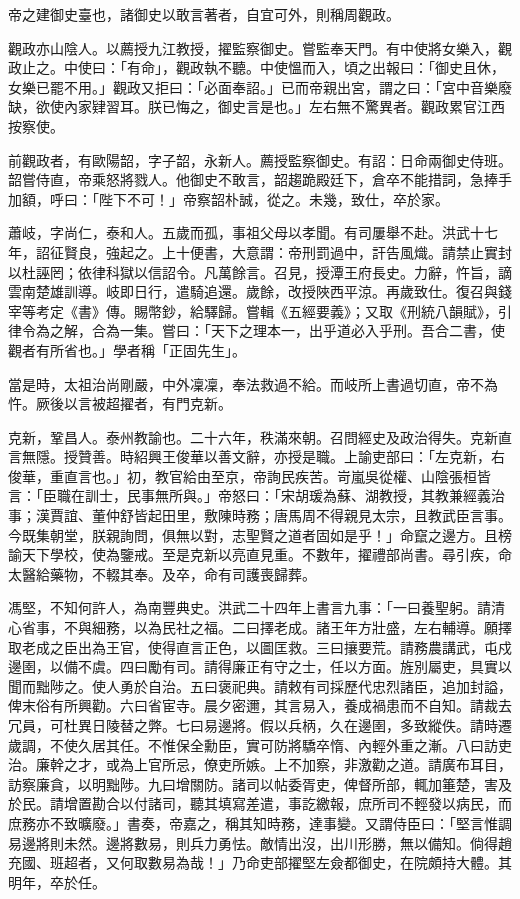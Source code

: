 \begin{pinyinscope}
帝之建御史臺也，諸御史以敢言著者，自宜可外，則稱周觀政。

觀政亦山陰人。以薦授九江教授，擢監察御史。嘗監奉天門。有中使將女樂入，觀政止之。中使曰：「有命」，觀政執不聽。中使慍而入，頃之出報曰：「御史且休，女樂已罷不用。」觀政又拒曰：「必面奉詔。」已而帝親出宮，謂之曰：「宮中音樂廢缺，欲使內家肄習耳。朕已悔之，御史言是也。」左右無不驚異者。觀政累官江西按察使。

前觀政者，有歐陽韶，字子韶，永新人。薦授監察御史。有詔：日命兩御史侍班。韶嘗侍直，帝乘怒將戮人。他御史不敢言，韶趨跪殿廷下，倉卒不能措詞，急捧手加額，呼曰：「陛下不可！」帝察韶朴誠，從之。未幾，致仕，卒於家。

蕭岐，字尚仁，泰和人。五歲而孤，事祖父母以孝聞。有司屢舉不赴。洪武十七年，詔征賢良，強起之。上十便書，大意謂：帝刑罰過中，訐告風熾。請禁止實封以杜誣罔；依律科獄以信詔令。凡萬餘言。召見，授潭王府長史。力辭，忤旨，謫雲南楚雄訓導。岐即日行，遣騎追還。歲餘，改授陜西平涼。再歲致仕。復召與錢宰等考定《書》傳。賜幣鈔，給驛歸。嘗輯《五經要義》；又取《刑統八韻賦》，引律令為之解，合為一集。嘗曰：「天下之理本一，出乎道必入乎刑。吾合二書，使觀者有所省也。」學者稱「正固先生」。

當是時，太祖治尚剛嚴，中外凜凜，奉法救過不給。而岐所上書過切直，帝不為忤。厥後以言被超擢者，有門克新。

克新，鞏昌人。泰州教諭也。二十六年，秩滿來朝。召問經史及政治得失。克新直言無隱。授贊善。時紹興王俊華以善文辭，亦授是職。上諭吏部曰：「左克新，右俊華，重直言也。」初，教官給由至京，帝詢民疾苦。岢嵐吳從權、山陰張桓皆言：「臣職在訓士，民事無所與。」帝怒曰：「宋胡瑗為蘇、湖教授，其教兼經義治事；漢賈誼、董仲舒皆起田里，敷陳時務；唐馬周不得親見太宗，且教武臣言事。今既集朝堂，朕親詢問，俱無以對，志聖賢之道者固如是乎！」命竄之邊方。且榜諭天下學校，使為鑒戒。至是克新以亮直見重。不數年，擢禮部尚書。尋引疾，命太醫給藥物，不輟其奉。及卒，命有司護喪歸葬。

馮堅，不知何許人，為南豐典史。洪武二十四年上書言九事：「一曰養聖躬。請清心省事，不與細務，以為民社之福。二曰擇老成。諸王年方壯盛，左右輔導。願擇取老成之臣出為王官，使得直言正色，以圖匡救。三曰攘要荒。請務農講武，屯戍邊圉，以備不虞。四曰勵有司。請得廉正有守之士，任以方面。旌別屬吏，具實以聞而黜陟之。使人勇於自治。五曰褒祀典。請敕有司採歷代忠烈諸臣，追加封謚，俾末俗有所興勸。六曰省宦寺。晨夕密邇，其言易入，養成禍患而不自知。請裁去冗員，可杜異日陵替之弊。七曰易邊將。假以兵柄，久在邊圉，多致縱佚。請時遷歲調，不使久居其任。不惟保全勳臣，實可防將驕卒惰、內輕外重之漸。八曰訪吏治。廉幹之才，或為上官所忌，僚吏所嫉。上不加察，非激勸之道。請廣布耳目，訪察廉貪，以明黜陟。九曰增關防。諸司以帖委胥吏，俾督所部，輒加箠楚，害及於民。請增置勘合以付諸司，聽其填寫差遣，事訖繳報，庶所司不輕發以病民，而庶務亦不致曠廢。」書奏，帝嘉之，稱其知時務，達事變。又謂侍臣曰：「堅言惟調易邊將則未然。邊將數易，則兵力勇怯。敵情出沒，出川形勝，無以備知。倘得趙充國、班超者，又何取數易為哉！」乃命吏部擢堅左僉都御史，在院頗持大體。其明年，卒於任。


\end{pinyinscope}
